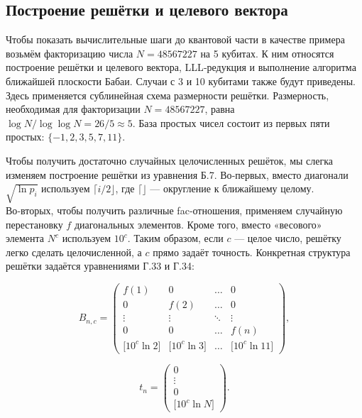 
\subsection*{Построение решётки и целевого вектора}

Чтобы показать вычислительные шаги до квантовой части в качестве примера
возьмём факторизацию числа \(N = 48567227\) на 5 кубитах. К ним относятся
построение решётки и целевого вектора, LLL‐редукция и выполнение алгоритма
ближайшей плоскости Бабаи. Случаи с 3 и 10 кубитами также будут приведены.
Здесь применяется сублинейная схема размерности решётки. Размерность,
необходимая для факторизации \(N = 48567227\), равна \(\log N / \log\log N =
26/5 \approx 5\). База простых чисел состоит из первых пяти простых: \(\{-1, 2,
3, 5, 7, 11\}\).

Чтобы получить достаточно случайных целочисленных решёток, мы слегка изменяем
построение решётки из уравнения Б.7. Во‑первых, вместо диагонали \(\sqrt{\ln
p_i}\) используем \(\lceil i/2 \rfloor\), где \(\lceil\rfloor\) — округление к
ближайшему целому. Во‑вторых, чтобы получить различные fac‐отношения, применяем
случайную перестановку \(f\) диагональных элементов. Кроме того, вместо
«весового» элемента \(N^{c}\) используем \(10^{c}\). Таким образом, если \(c\)
— целое число, решётку легко сделать целочисленной, а \(c\) прямо задаёт
точность. Конкретная структура решётки задаётся уравнениями Г.33 и Г.34:

\begin{equation}
B_{n,c}=
\begin{pmatrix}
f(1) & 0 & \dots & 0 \\
0 & f(2) & \dots & 0 \\
\vdots & \vdots & \ddots & \vdots \\
0 & 0 & \dots & f(n) \\
\bigl[10^{c}\ln 2\bigr] & \bigl[10^{c}\ln 3\bigr] & \dots & \bigl[10^{c}\ln 11\bigr]
\end{pmatrix},
\end{equation}

\begin{equation}
t_{n}=
\begin{pmatrix}
0 \\ \vdots \\ 0 \\ \bigl[10^{c}\ln N\bigr]
\end{pmatrix}.
\end{equation}

